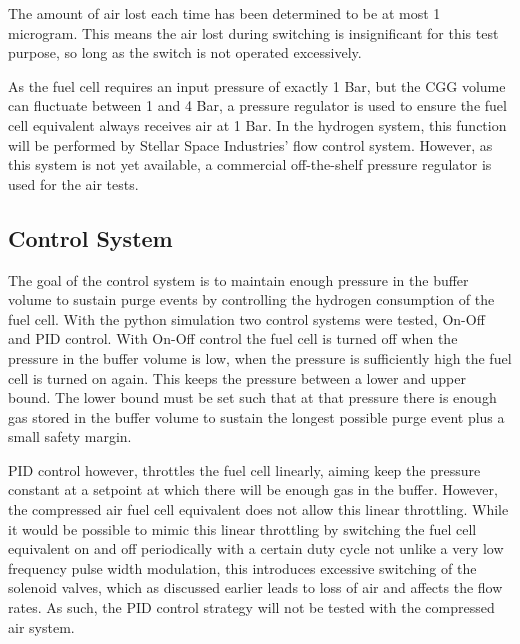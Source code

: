 The amount of air lost each time has been determined to be at most 1 microgram. This means the air lost during switching is insignificant for this test purpose, so long as the switch is not operated excessively.

As the fuel cell requires an input pressure of exactly 1 Bar, but the CGG volume can fluctuate between 1 and 4 Bar, a pressure regulator is used to ensure the fuel cell equivalent always receives air at 1 Bar. In the hydrogen system, this function will be performed by Stellar Space Industries' flow control system. However, as this system is not yet available, a commercial off-the-shelf pressure regulator is used for the air tests.

\subsection*{Control System}
The goal of the control system is to maintain enough pressure in the buffer volume to sustain purge events by controlling the hydrogen consumption of the fuel cell. With the python simulation two control systems were tested, On-Off and PID control. With On-Off control the fuel cell is turned off when the pressure in the buffer volume is low, when the pressure is sufficiently high  the fuel cell is turned on again. This keeps the pressure between a lower and upper bound. The lower bound must be set such that at that pressure there is enough gas stored in the buffer volume to sustain the longest possible purge event plus a small safety margin.

PID control however, throttles the fuel cell linearly, aiming keep the pressure constant at a setpoint at which there will be enough gas in the buffer. However, the compressed air fuel cell equivalent does not allow this linear throttling. While it would be possible to mimic this linear throttling by switching the fuel cell equivalent on and off periodically with a certain duty cycle not unlike a very low frequency pulse width modulation, this introduces excessive switching of the solenoid valves, which as discussed earlier leads to loss of air and affects the flow rates. As such, the PID control strategy will not be tested with the compressed air system.



\clearpage
